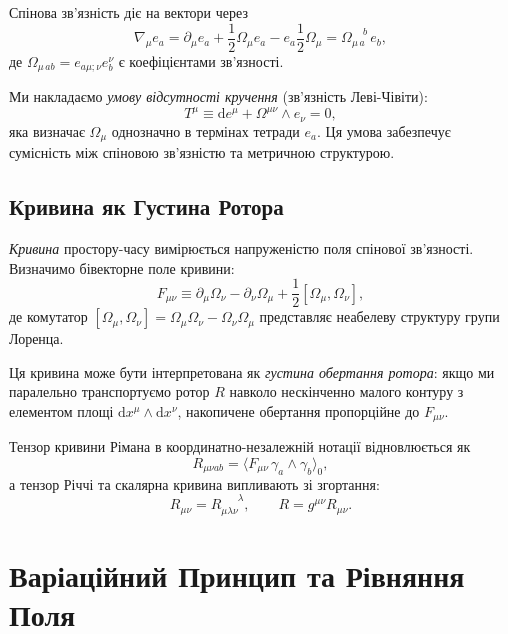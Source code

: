 \documentclass[11pt,a4paper]{article}
\numberwithin{equation}{section}
\theoremstyle{plain}
\theoremstyle{definition}
\theoremstyle{remark}
\newcommand{\dd}{\mathrm{d}}
\begin{document}
Спінова зв'язність діє на вектори через
\begin{equation}
\nabla_\mu e_a = \partial_\mu e_a + \frac{1}{2}\Omega_\mu e_a - e_a \frac{1}{2}\Omega_\mu = \Omega_{\mu\, a}^{\phantom{\mu a}b}\, e_b,
\end{equation}
де $\Omega_{\mu\, ab} = e_{a\mu;\nu} e_b^\nu$ є коефіцієнтами зв'язності.

Ми накладаємо \emph{умову відсутності кручення} (зв'язність Леві-Чівіти):
\begin{equation}
T^\mu \equiv \dd e^\mu + \Omega^{\mu\nu} \wedge e_\nu = 0,
\label{eq:torsion-free}
\end{equation}
яка визначає $\Omega_\mu$ однозначно в термінах тетради $e_a$. Ця умова забезпечує сумісність між спіновою зв'язністю та метричною структурою.

\subsection{Кривина як Густина Ротора}

\emph{Кривина} простору-часу вимірюється напруженістю поля спінової зв'язності. Визначимо бівекторне поле кривини:
\begin{equation}
F_{\mu\nu} \equiv \partial_\mu \Omega_\nu - \partial_\nu \Omega_\mu + \frac{1}{2}[\Omega_\mu, \Omega_\nu],
\label{eq:curvature}
\end{equation}
де комутатор $[\Omega_\mu, \Omega_\nu] = \Omega_\mu \Omega_\nu - \Omega_\nu \Omega_\mu$ представляє неабелеву структуру групи Лоренца.

Ця кривина може бути інтерпретована як \emph{густина обертання ротора}: якщо ми паралельно транспортуємо ротор $R$ навколо нескінченно малого контуру з елементом площі $\dd x^\mu \wedge \dd x^\nu$, накопичене обертання пропорційне до $F_{\mu\nu}$.

Тензор кривини Рімана в координатно-незалежній нотації відновлюється як
\begin{equation}
R_{\mu\nu ab} = \langle F_{\mu\nu}\, \gamma_a \wedge \gamma_b \rangle_0,
\end{equation}
а тензор Річчі та скалярна кривина випливають зі згортання:
\begin{equation}
R_{\mu\nu} = R_{\mu\lambda\nu}^{\phantom{\mu\lambda\nu}\lambda}, \qquad R = g^{\mu\nu} R_{\mu\nu}.
\end{equation}

\section{Варіаційний Принцип та Рівняння Поля}
\label{sec:main}
\end{document}
